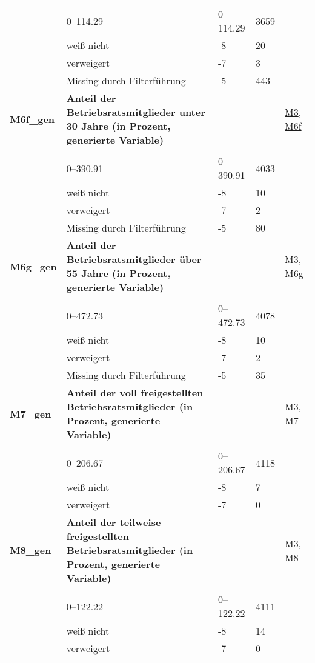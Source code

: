\begin{longtable}{| L{2.5cm} | L{8.25cm}| C{1.5cm} | R{1.25cm} | C{2.25cm} |  }
   & 0--114.29 & 0--114.29 & 3659 &  \\ 
   & weiß nicht & -8 & 20 &  \\ 
   & verweigert & -7 & 3 &  \\ 
   & Missing durch Filterführung & -5 & 443 &  \\ 
   \midrule
\textbf{M6f\_gen}\label{var:suf:M6f:gen} & \textbf{Anteil der Betriebsratsmitglieder unter 30 Jahre (in Prozent, generierte Variable)} &  &  & \hyperref[M3]{M3}, \hyperref[M6f]{M6f} \\ 
   &  &  &  &  \\ 
   & 0--390.91 & 0--390.91 & 4033 &  \\ 
   & weiß nicht & -8 & 10 &  \\ 
   & verweigert & -7 & 2 &  \\ 
   & Missing durch Filterführung & -5 & 80 &  \\ 
   \midrule
\textbf{M6g\_gen}\label{var:suf:M6g:gen} & \textbf{Anteil der Betriebsratsmitglieder über 55 Jahre (in Prozent, generierte Variable)} &  &  & \hyperref[M3]{M3}, \hyperref[M6g]{M6g} \\ 
   &  &  &  &  \\ 
   & 0--472.73 & 0--472.73 & 4078 &  \\ 
   & weiß nicht & -8 & 10 &  \\ 
   & verweigert & -7 & 2 &  \\ 
   & Missing durch Filterführung & -5 & 35 &  \\ 
   \midrule
\textbf{M7\_gen}\label{var:suf:M7:gen} & \textbf{Anteil der voll freigestellten Betriebsratsmitglieder (in Prozent, generierte Variable)} &  &  & \hyperref[M3]{M3}, \hyperref[M7]{M7} \\ 
   &  &  &  &  \\ 
   & 0--206.67 & 0--206.67 & 4118 &  \\ 
   & weiß nicht & -8 & 7 &  \\ 
   & verweigert & -7 & 0 &  \\ 
   \midrule
\textbf{M8\_gen}\label{var:suf:M8:gen} & \textbf{Anteil der teilweise freigestellten Betriebsratsmitglieder (in Prozent, generierte Variable)} &  &  & \hyperref[M3]{M3}, \hyperref[M8]{M8} \\ 
   &  &  &  &  \\ 
   & 0--122.22 & 0--122.22 & 4111 &  \\ 
   & weiß nicht & -8 & 14 &  \\ 
   & verweigert & -7 & 0 &  \\ 

\end{longtable}
